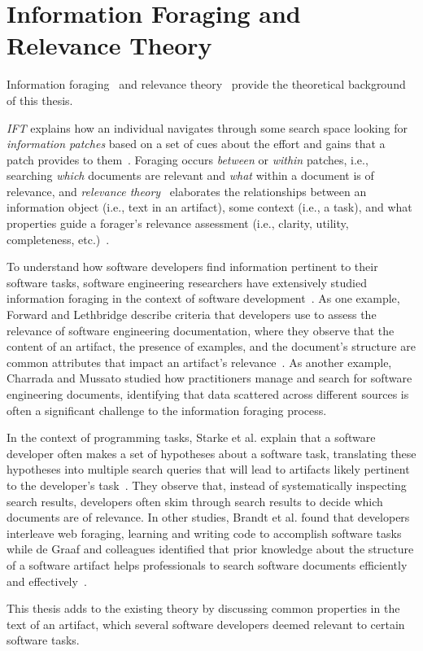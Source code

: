 \section{Information Foraging and Relevance Theory}
\label{cp2:foraging}



Information foraging~\cite{Pirolli1999}
and relevance theory~\cite{clark2013relevance, saracevic1975, Saracevic2007c, Saracevic2007b} 
provide the theoretical background of this thesis.


\textit{\acf{IFT}} explains how 
an individual navigates through some search space looking for \textit{information patches} based on 
a set of cues about the effort and gains that a patch provides to them~\cite{Pirolli1999}.
Foraging occurs \textit{between} or \textit{within} patches, i.e., 
searching \textit{which} documents are relevant and \textit{what} within a document is of relevance,
and \textit{relevance theory}~\cite{clark2013relevance, saracevic1975} elaborates the relationships between an information object (i.e., text in an artifact),
some context (i.e., a task), and what properties guide a forager's relevance assessment (i.e., clarity, utility, completeness, etc.)~\cite{Saracevic2007c}. 




To understand how software developers find  information pertinent to their software tasks,
software engineering researchers have extensively studied information foraging in the context of software development~\cite{Piorkowski2015, Piorkowski2016, chi2007, Ko2006a}.
As one example,
 Forward and Lethbridge describe criteria that developers use to assess the relevance of software engineering documentation, where they observe that the content of an artifact, the presence of examples, and the document's structure are common attributes that impact an artifact's relevance~\cite{Forward2002}.
As another example, Charrada and Mussato studied how 
practitioners manage and search for software engineering documents, 
identifying that data scattered across different sources is 
often a significant challenge to the information foraging process.



In the context of programming tasks, Starke et al. explain that a software developer often makes a set of hypotheses about a software task,
translating these hypotheses into multiple search queries that will lead to artifacts likely pertinent to the developer's task~\cite{Starke2009}. 
They observe that, instead of systematically inspecting search results,
developers often skim through search results to decide which documents are of relevance. 
In other studies, Brandt et al. found that developers interleave web foraging, learning and writing code 
to accomplish software tasks~\cite{Brandt2009a} while de Graaf and colleagues 
identified that prior knowledge about the structure of a software artifact helps professionals
to search software documents efficiently and effectively~\cite{DeGraaf2014}.


This thesis adds to the existing theory by discussing 
common properties in the text of an artifact, which several software developers deemed relevant 
to certain software tasks.  

